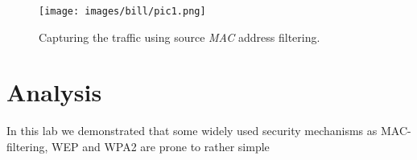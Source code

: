 \documentclass[12pt,a4paper]{article}
\begin{document}
	
	\begin{figure}
		\texttt{[image: images/bill/pic1.png]}
		\caption{Capturing the traffic using source \emph{MAC} address filtering.}
		\label{wep:wireshark}
	\end{figure}
	
	\section{Analysis}
	In this lab we demonstrated that some widely used security mechanisms as MAC-filtering, WEP and WPA2 are prone to rather simple 
	
	
	
	
\end{document}
